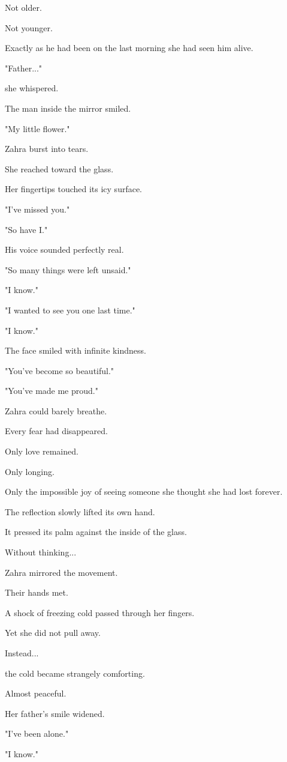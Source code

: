 \documentclass[12pt,openany]{book}
\begin{document}
Not older.

Not younger.

Exactly as he had been on the last morning she had seen him alive.

"Father..."

she whispered.

The man inside the mirror smiled.

"My little flower."

Zahra burst into tears.

She reached toward the glass.

Her fingertips touched its icy surface.

"I've missed you."

"So have I."

His voice sounded perfectly real.

"So many things were left unsaid."

"I know."

"I wanted to see you one last time."

"I know."

The face smiled with infinite kindness.

"You've become so beautiful."

"You've made me proud."

Zahra could barely breathe.

Every fear had disappeared.

Only love remained.

Only longing.

Only the impossible joy of seeing someone she thought she had lost forever.

The reflection slowly lifted its own hand.

It pressed its palm against the inside of the glass.

Without thinking...

Zahra mirrored the movement.

Their hands met.

A shock of freezing cold passed through her fingers.

Yet she did not pull away.

Instead...

the cold became strangely comforting.

Almost peaceful.

Her father's smile widened.

"I've been alone."

"I know."
\end{document}
